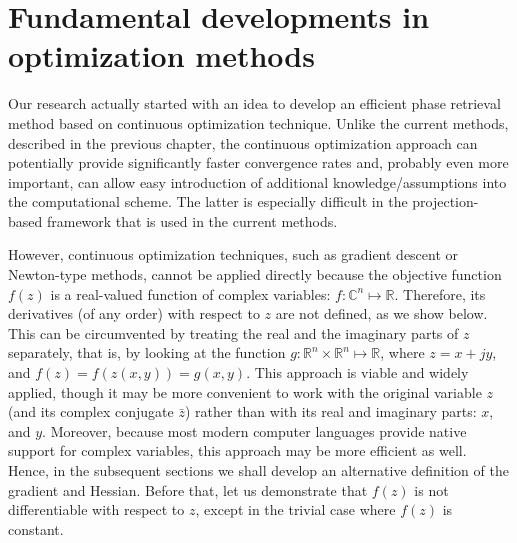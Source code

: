 \chapter{Fundamental developments in optimization
  methods\footnotemark{}}
\label{cha:found-optim-meth}


Our research actually started with an idea to develop an efficient
phase retrieval method based on continuous optimization
technique. Unlike the current methods, described in the previous
chapter, the continuous optimization approach can potentially provide significantly
faster convergence rates and, probably even more important, can allow
easy introduction of additional knowledge/assumptions into the
computational scheme. The latter is especially difficult in the
projection-based framework that is used in the current methods.

However, continuous optimization techniques, such as gradient descent
or Newton-type methods, cannot be applied directly
because the objective function $f(z)$ is a real-valued function of
complex variables: $f:\mathbb{C}^{n} \mapsto \mathbb{R}$. Therefore, its
derivatives (of any order) with respect to $z$ are
not defined, as we show below. This can be circumvented by treating the
real and the imaginary parts of $z$ separately, that is, by looking at
the function $g:\mathbb R^{n}\times\mathbb R^{n} \mapsto \mathbb R$,
where $z = x+jy$, and $f(z) = f(z(x,y)) = g(x,y)$. This approach is
viable and widely applied, though it may be more convenient to work
with the original variable $z$ (and its complex conjugate $\bar{z}$)
rather than with its real and imaginary parts: $x$, and $y$. Moreover,
because most modern computer languages provide native support for
complex variables, this approach may be more efficient as well. Hence,
in the subsequent sections we shall develop an alternative definition
of the gradient and Hessian. Before that, let us demonstrate that
$f(z)$ is not differentiable with respect to $z$, except in the trivial
case where $f(z)$ is constant.
 
